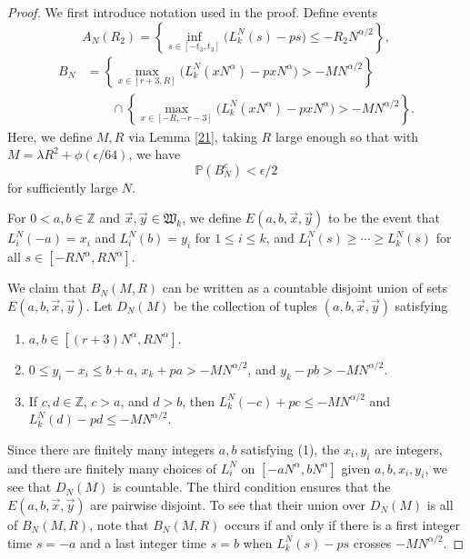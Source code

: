 	\begin{proof}
		We first introduce notation used in the proof. Define events
		\[
		A_N(R_2) = \left\{\inf_{s \in [ -t_3, t_3 ]}\big(L^N_k(s) - p s \big) \leq - R_2N^{\alpha/2}\right\},
		\]
		\begin{align*}
		B_N &= \left\{ \max_{x\in [r+3, R]} \big(L^N_k(xN^\alpha) - pxN^\alpha\big) > -MN^{\alpha/2} \right\}\\
		&\qquad \cap \left\{ \max_{x\in [-R, -r-3]} \big(L^N_k(xN^\alpha) - pxN^\alpha\big) > -MN^{\alpha/2} \right\}.
		\end{align*}
		Here, we define $M,R$ via Lemma \ref{21}, taking $R$ large enough so that with $M = \lambda R^2 + \phi(\epsilon/64)$, we have 
		\begin{equation}\label{4.3Bbound}
		\mathbb{P}(B_N^c) < \epsilon/2
		\end{equation} 
		for sufficiently large $N$. 
		
		For $0<a,b\in\mathbb{Z}$ and $\vec{x},\vec{y}\in\mathfrak{W}_k$, we define $E(a,b,\vec{x},\vec{y})$ to be the event that $L_i^N(-a) = x_i$ and $L_i^N(b) = y_i$ for $1\leq i\leq k$, and $L_1^N(s) \geq \cdots \geq L_k^N(s)$ for all $s\in[-RN^\alpha,RN^\alpha]$.
		
		We claim that $B_N(M,R)$ can be written as a countable disjoint union of sets $E(a,b,\vec{x},\vec{y})$. Let $D_N(M)$ be the collection of tuples $(a,b,\vec{x},\vec{y})$ satisfying 
		\begin{enumerate}[label=(\arabic*)]
			
			\item $a,b\in[(r+3)N^\alpha,RN^\alpha]$.
			
			\item $0 \leq y_i - x_i \leq b+a$, $x_k + pa > - MN^{\alpha/2}$, and $y_k - pb > - MN^{\alpha/2}$.
			
			\item If $c,d\in\mathbb{Z}$, $c > a$, and $d > b$, then $L_k^N(-c) + pc \leq -MN^{\alpha/2}$ and $L_k^N(d) - pd \leq -MN^{\alpha/2}$.
			
		\end{enumerate} 
		Since there are finitely many integers $a,b$ satisfying (1), the $x_i,y_i$ are integers, and there are finitely many choices of $L_i^N$ on $[-aN^\alpha, bN^\alpha]$ given $a,b,x_i,y_i$, we see that $D_N(M)$ is countable. The third condition ensures that the $E(a,b,\vec{x},\vec{y})$ are pairwise disjoint. To see that their union over $D_N(M)$ is all of $B_N(M,R)$, note that $B_N(M,R)$ occurs if and only if there is a first integer time $s=-a$ and a last integer time $s=b$ when $L_k^N(s)-ps$ crosses $-MN^{\alpha/2}$.
		

\end{proof}
